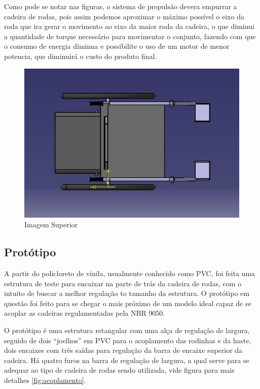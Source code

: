 Como pode se notar nas figuras, o sistema de propulsão devera empurrar a cadeira de rodas, pois assim podemos aproximar o máximo possível o eixo da roda que ira gerar o movimento ao eixo da maior roda da cadeira, o que diminui a quantidade de torque necessário para movimentar o conjunto, fazendo com que o consumo de energia diminua e possibilite o uso de um motor de menor potencia, que diminuirá o custo do produto final.

\begin{figure}[!htb]
\centering
\includegraphics[keepaspectratio=true,scale=0.4]{figuras/estrutura/vista_superior}
\caption{Imagem Superior}
\label{fig:superior}
\end{figure}

\subsection{Protótipo}

A partir do policloreto de vinila, usualmente conhecido como PVC, foi feita uma estrutura de teste para encaixar na parte de trás da cadeira de rodas, com o intuito de buscar a melhor regulação to tamanho da estrutura. O protótipo em questão foi feito para se chegar o mais próximo de um modelo ideal capaz de se acoplar as cadeiras regulamentadas pela NBR 9050.

O protótipo é uma estrutura retangular com uma alça de regulação de largura, seguido de dois “joelhos” em PVC para o acoplamento das rodinhas e da haste, dois encaixes com três saídas para regulação da barra de encaixe superior da cadeira. Há quatro furos na barra de regulação de largura, a qual serve para se adequar ao tipo de cadeira de rodas sendo utilizada, vide figura para mais detalhes \ref{fig:acoplamento}.

